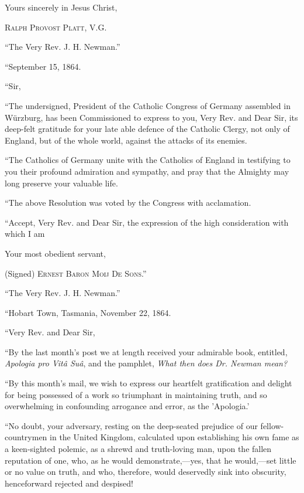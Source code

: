 Yours sincerely in Jesus Christ,

R\textsc{alph} P\textsc{rovost} P\textsc{latt}, V.G.

``The Very Rev. J. H. Newman.''


``September 15, 1864.

``Sir,

``The undersigned, President of the Catholic Congress of Germany
assembled in Würzburg, has been Commissioned to express to you, Very
Rev. and Dear Sir, its deep-felt gratitude for your late able defence of
the Catholic Clergy, not only of England, but of the whole world,
against the attacks of its enemies.

``The Catholics of Germany unite with the Catholics of England in
testifying to you their profound admiration and sympathy, and pray that
the Almighty may long preserve your valuable life.

``The above Resolution was voted by the Congress with
acclamation.

``Accept, Very Rev. and Dear Sir, the expression of the high
consideration with which I am

Your most obedient servant,

(Signed) E\textsc{rnest} B\textsc{aron} M\textsc{oij}
D\textsc{e} S\textsc{ons}.''

``The Very Rev. J. H. Newman.''


``Hobart Town, Tasmania, November 22, 1864.

``Very Rev. and Dear Sir,

``By the last month's post we at length received your admirable
book, entitled, \emph{Apologia pro Vitâ Suâ}, and the pamphlet, \emph{What then
does Dr. Newman mean?}

``By this month's mail, we wish to express our heartfelt
gratification and delight for being possessed of a work so triumphant in
maintaining truth, and so overwhelming in confounding arrogance and
error, as the 'Apologia.'

``No doubt, your adversary, resting on the deep-seated prejudice
of our fellow-countrymen in the United Kingdom, calculated upon
establishing his own fame as a keen-sighted polemic, as a shrewd and
truth-loving man, upon the fallen reputation of one, who, as he would
demonstrate,—yes, that he would,—set little or no value on truth,
and who, therefore, would deservedly sink into obscurity, henceforward
rejected and despised!


